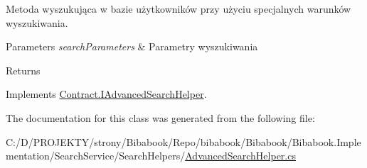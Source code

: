 Metoda wyszukująca w bazie użytkowników przy użyciu specjalnych warunków wyszukiwania. 


\begin{DoxyParams}{Parameters}
{\em search\+Parameters} & Parametry wyszukiwania\\
\hline
\end{DoxyParams}
\begin{DoxyReturn}{Returns}

\end{DoxyReturn}


Implements \hyperlink{interface_contract_1_1_i_advanced_search_helper_aabbc690898bb9d0cbfa8e62a32be42e8}{Contract.\+I\+Advanced\+Search\+Helper}.



The documentation for this class was generated from the following file\+:\begin{DoxyCompactItemize}
\item 
C\+:/\+D/\+P\+R\+O\+J\+E\+K\+T\+Y/strony/\+Bibabook/\+Repo/bibabook/\+Bibabook/\+Bibabook.\+Implementation/\+Search\+Service/\+Search\+Helpers/\hyperlink{_advanced_search_helper_8cs}{Advanced\+Search\+Helper.\+cs}\end{DoxyCompactItemize}
